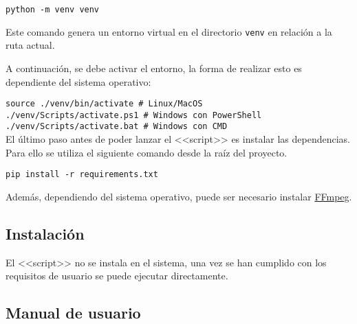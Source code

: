 \texttt{python -m venv venv}

Este comando genera un entorno virtual en el directorio \texttt{venv} en
relación a la ruta actual.

A continuación, se debe activar el entorno, la forma de realizar esto es
dependiente del sistema operativo:

\texttt{source ./venv/bin/activate \# Linux/MacOS} \\

\texttt{./venv/Scripts/activate.ps1 \# Windows con PowerShell} \\

\texttt{./venv/Scripts/activate.bat \# Windows con CMD} \\

El último paso antes de poder lanzar el <<script>> es instalar las dependencias.
Para ello se utiliza el siguiente comando desde la raíz del proyecto.

\texttt{pip install -r requirements.txt}

Además, dependiendo del sistema operativo, puede ser necesario instalar
\href{https://ffmpeg.org/}{FFmpeg}.

\subsection{Instalación}

El <<script>> no se instala en el sistema, una vez se han cumplido con los
requisitos de usuario se puede ejecutar directamente.

\subsection{Manual de usuario}


